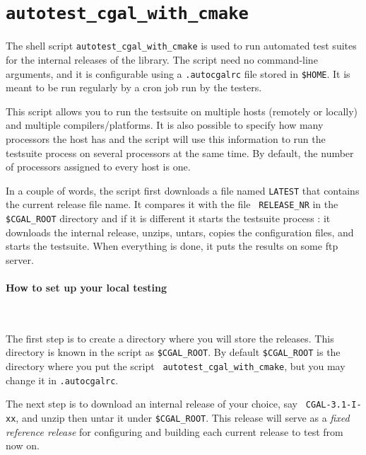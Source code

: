 
\section{{\tt autotest\_cgal\_with\_cmake}}
\label{sec:autotest_cgal_with_cmake}

The shell script {\tt autotest\_cgal\_with\_cmake} is used to run automated test suites for
the internal releases of the library. The script need no command-line
arguments, and it is configurable using a {\tt .autocgalrc} file stored
in {\tt \$HOME}.
It is meant to be run regularly by a cron job run by the testers.

This script allows you to run the testsuite on multiple hosts (remotely or
locally) and multiple compilers/platforms. It is also possible to specify how
many processors the host has and the script will use this information to run
the testsuite process on several processors at the same time. By default, the
number of processors assigned to every host is one.

In a couple of words, the script first downloads a file named {\tt LATEST}
that contains the current release file name. It compares it with the file {\tt
RELEASE\_NR} in the {\tt \$CGAL\_ROOT} directory and if it is different it
starts the testsuite process : it downloads the internal release, unzips,
untars, copies the configuration files, and starts the testsuite. When
everything is done, it puts the results on some ftp server.

\paragraph{How to set up your local testing} ~

The first step is to create a directory where you will store the releases.
This directory is known in the script as {\tt \$CGAL\_ROOT}. By default
{\tt \$CGAL\_ROOT} is the directory where you put the script {\tt
autotest\_cgal\_with\_cmake}, but you may change it in {\tt .autocgalrc}.

The next step is to download an internal release of your choice, say {\tt
CGAL-3.1-I-xx}, and unzip then untar it under {\tt \$CGAL\_ROOT}.
This release will serve as a {\em fixed reference release} for configuring
and building each current release to test from now on.

